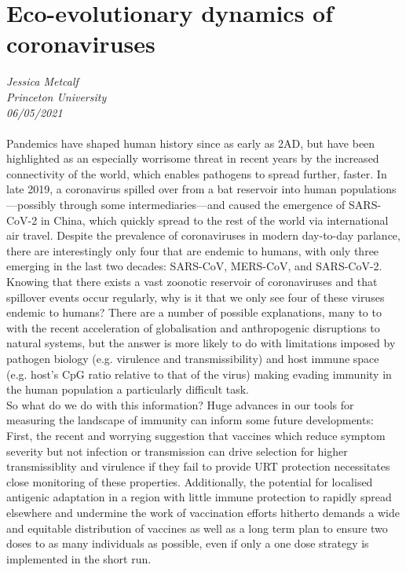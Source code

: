 \documentclass[11pt]{article}
\begin{document}
\section{Eco-evolutionary dynamics of coronaviruses}
\textit{Jessica Metcalf\\Princeton University\\06/05/2021}
\\
\\
Pandemics have shaped human history since as early as 2AD, but have been highlighted as an especially worrisome threat in recent years by the increased connectivity of the world, which enables pathogens to spread further, faster. In late 2019, a coronavirus spilled over from a bat reservoir into human populations—possibly through some intermediaries—and caused the emergence of SARS-CoV-2 in China, which quickly spread to the rest of the world via international air travel. Despite the prevalence of coronaviruses in modern day-to-day parlance, there are interestingly only four that are endemic to humans, with only three emerging in the last two decades: SARS-CoV, MERS-CoV, and SARS-CoV-2. Knowing that there exists a vast zoonotic reservoir of coronaviruses and that spillover events occur regularly, why is it that we only see four of these viruses endemic to humans? There are a number of possible explanations, many to to with the recent acceleration of globalisation and anthropogenic disruptions to natural systems, but the answer is more likely to do with limitations imposed by pathogen biology (e.g. virulence and transmissibility) and host immune space (e.g. host's CpG ratio relative to that of the virus) making evading immunity in the human population a particularly difficult task.\\
So what do we do with this information? Huge advances in our tools for measuring the landscape of immunity can inform some future developments: First, the recent and worrying suggestion that vaccines which reduce symptom severity but not infection or transmission can drive selection for higher transmissiblity and virulence if they fail to provide URT protection necessitates close monitoring of these properties. Additionally, the potential for localised antigenic adaptation in a region with little immune protection to rapidly spread elsewhere and undermine the work of vaccination efforts hitherto demands a wide and equitable distribution of vaccines as well as a long term plan to ensure two doses to as many individuals as possible, even if only a one dose strategy is implemented in the short run.
\end{document}
